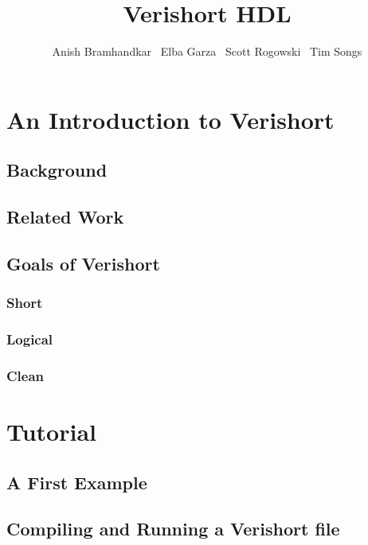 \setlength{\topmargin}{-.5in}
\setlength{\textheight}{9in}
\setlength{\oddsidemargin}{.125in}
\setlength{\textwidth}{6.25in}


\title{Verishort HDL}
\author{Anish Bramhandkar \ Elba Garza \ Scott Rogowski \ Tim Songs}
\renewcommand{\today}{December 22, 2010}
\maketitle

\newpage

\tableofcontents

\newpage

\section{An Introduction to Verishort}
    \subsection{Background}

    \subsection{Related Work}
        \subsection{Goals of Verishort}
        \subsubsection{Short}
        \subsubsection{Logical}
        \subsubsection{Clean}


\section{Tutorial}
    \subsection{A First Example}
    \subsection{Compiling and Running a Verishort file}
